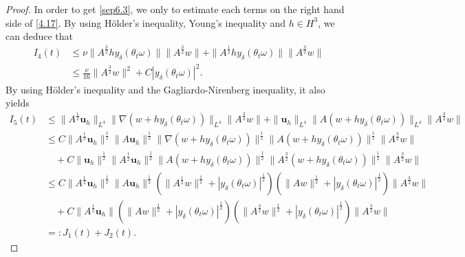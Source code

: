 \documentclass[10pt,a4paper]{amsart}
\begin{document}
\begin{proof}
In order to get \eqref{sep6.3}, we only to estimate each terms on the right hand side of \eqref{4.17}.
By using H\"{o}lder's inequality, Young's inequality and $h\in H^3$,  we can deduce that
\begin{align}
I_{4}(t)&\leq  \nu \|A^{\frac32}hy_\delta(\theta_t\omega)\|\|A^{\frac32}w\|+ \|A^{\frac12}hy_\delta(\theta_t\omega)\|\|A^{\frac32}w\|\nonumber\\
&\leq \frac{ \nu }{16}\|A^{\frac32}w\|^2+C  |y_\delta(\theta_t\omega)|^2. \label{4.18}
\end{align}
By using H\"{o}lder's inequality and the Gagliardo-Nirenberg inequality, it also yields
\begin{align}
I_{5}(t)&\leq\|A^\frac12\textbf{u}_h\|_{L^4}\|\nabla(w+hy_\delta(\theta_t\omega))\|_{L^4}\|A^\frac32w\|
+\|\textbf{u}_h\|_{L^4}\|A(w+hy_\delta(\theta_t\omega))\|_{L^4}\|A^\frac32w\|
\nonumber\\
&\leq C\|A^\frac12\textbf{u}_h\|^\frac12\|A\textbf{u}_h\|^\frac12
\|\nabla(w+hy_\delta(\theta_t\omega))\|^\frac12\|A(w+hy_\delta(\theta_t\omega))\|^\frac12
\|A^\frac32w\|\nonumber\\
& \quad +C\|\textbf{u}_h\|^\frac12\|A^{\frac12}\textbf{u}_h\|^\frac12
\|A(w+hy_\delta(\theta_t\omega))\|^\frac12\|A^{\frac32}(w+hy_\delta(\theta_t\omega))\|^\frac12\|A^\frac32w\|\nonumber\\
&\leq  C\|A^\frac12\textbf{u}_h\|^\frac12\|A\textbf{u}_h\|^\frac12
\left(\|A^{\frac12}w\|^\frac12+ |y_\delta(\theta_t\omega)|^\frac12 \right) \left (\|Aw\|^\frac12+ |y_\delta(\theta_t\omega) |^\frac12 \right)
\|A^\frac32w\|\nonumber\\
&\quad +C\|A^{\frac12}\textbf{u}_h\| \left (\|Aw\|^\frac12+ |y_\delta(\theta_t\omega)|^\frac12\right)\left(\|A^{\frac32}w\|^\frac12
+ | y_\delta(\theta_t\omega)|^\frac12 \right)\|A^\frac32w\|\nonumber\\
&=: J_1(t) +J_2(t) . \nonumber
\end{align}


\end{proof}
\end{document}
